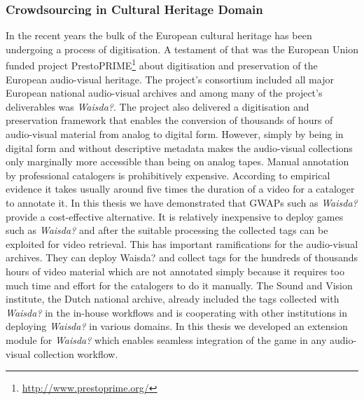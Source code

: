 \subsubsection{Crowdsourcing in Cultural Heritage Domain}
In the recent years the bulk of the European cultural heritage has been undergoing a process of digitisation. A testament of that was the European Union funded project PrestoPRIME\footnote{\url{http://www.prestoprime.org/}} about digitisation and preservation of the European audio-visual heritage. The project's consortium included all major European national audio-visual archives and among many of the project's deliverables was \textit{Waisda?}. The project also delivered a digitisation and preservation framework that enables the conversion of thousands of hours of audio-visual material from analog to digital form. However, simply by being in digital form and without descriptive metadata makes the audio-visual collections only marginally more accessible than being on analog tapes. Manual annotation by professional catalogers is prohibitively expensive. According to empirical evidence it takes usually around five times the duration of a video for a cataloger to annotate it. In this thesis we have demonstrated that GWAPs such as \textit{Waisda?} provide a cost-effective alternative. It is relatively inexpensive to deploy games such as \textit{Waisda?} and after the suitable processing the collected tags can be exploited for video retrieval. This has important ramifications for the audio-visual archives. They can deploy Waisda? and collect tags for the hundreds of thousands hours of video material which are not annotated simply because it requires too much time and effort for the catalogers to do it manually. The Sound and Vision institute, the Dutch national archive, already included the tags collected with \textit{Waisda?} in the in-house workflows and is cooperating with other institutions in deploying \textit{Waisda?} in various domains. In this thesis we developed an extension module for \textit{Waisda?} which enables seamless integration of the game in any audio-visual collection workflow.

